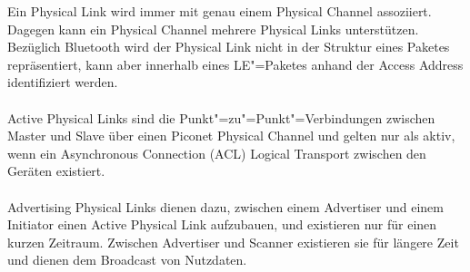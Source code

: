 Ein Physical Link wird immer mit genau einem Physical Channel assoziiert. Dagegen kann ein Physical Channel mehrere Physical Links unterstützen. Bezüglich Bluetooth wird der Physical Link nicht in der Struktur eines Paketes repräsentiert, kann aber innerhalb eines LE"=Paketes anhand der Access Address identifiziert werden. \cite{BtSpec4.0_164}
\\\\
Active Physical Links sind die Punkt"=zu"=Punkt"=Verbindungen zwischen Master und Slave über einen Piconet Physical Channel und gelten nur als aktiv, wenn ein Asynchronous Connection (ACL) Logical Transport zwischen den Geräten existiert. \cite{BtSpec4.0_166-167}
\\\\
Advertising Physical Links dienen dazu, zwischen einem Advertiser und einem Initiator einen Active Physical Link aufzubauen, und existieren nur für einen kurzen Zeitraum. Zwischen Advertiser und Scanner existieren sie für längere Zeit und dienen dem Broadcast von Nutzdaten. \cite{BtSpec4.0_166-167}